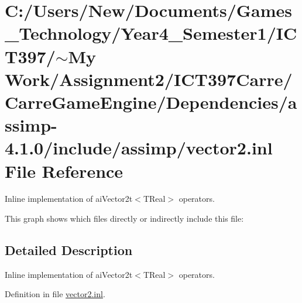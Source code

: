 \hypertarget{vector2_8inl}{
\section{C:/Users/New/Documents/Games\_\-Technology/Year4\_\-Semester1/ICT397/$\sim$My Work/Assignment2/ICT397Carre/CarreGameEngine/Dependencies/assimp-4.1.0/include/assimp/vector2.inl File Reference}
\label{vector2_8inl}
}
Inline implementation of aiVector2t$<$TReal$>$ operators. 



This graph shows which files directly or indirectly include this file:

\subsection{Detailed Description}
Inline implementation of aiVector2t$<$TReal$>$ operators. 



Definition in file \hyperlink{vector2_8inl-source}{vector2.inl}.
